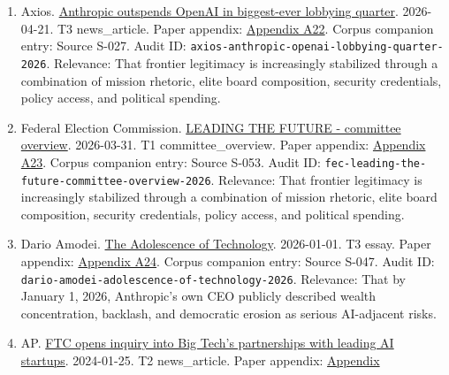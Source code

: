 \documentclass[
  american,
  11pt,
  letterpaper,
]{article}
\begin{document}
\begin{enumerate}
  press\_release. Paper appendix:
  \hyperref[appendix-a21-anthropic-and-palantir-partner-to-bring-claude-ai-models-to-aws-for-u-s-government-intelligence-and-defense-operations]{Appendix
  A21}. Corpus companion entry: Source S-098. Audit ID:
  \texttt{palantir-anthropic-aws-gov-partnership-2024}. Relevance: That
  by November 7, 2024 Anthropic model access for U.S. intelligence and
  defense agencies was being publicly distributed through a
  Palantir-plus-AWS stack.
\item
  Axios.
  \href{https://www.axios.com/2026/04/21/anthropic-outspends-openai-biggest-lobbying-quarter}{Anthropic
  outspends OpenAI in biggest-ever lobbying quarter}. 2026-04-21. T3
  news\_article. Paper appendix:
  \hyperref[appendix-a22-anthropic-outspends-openai-in-biggest-ever-lobbying-quarter]{Appendix
  A22}. Corpus companion entry: Source S-027. Audit ID:
  \texttt{axios-anthropic-openai-lobbying-quarter-2026}. Relevance: That
  frontier legitimacy is increasingly stabilized through a combination
  of mission rhetoric, elite board composition, security credentials,
  policy access, and political spending.
\item
  Federal Election Commission.
  \href{https://www.fec.gov/data/committee/C00916114/}{LEADING THE
  FUTURE - committee overview}. 2026-03-31. T1 committee\_overview.
  Paper appendix:
  \hyperref[appendix-a23-leading-the-future-committee-overview]{Appendix
  A23}. Corpus companion entry: Source S-053. Audit ID:
  \texttt{fec-leading-the-future-committee-overview-2026}. Relevance:
  That frontier legitimacy is increasingly stabilized through a
  combination of mission rhetoric, elite board composition, security
  credentials, policy access, and political spending.
\item
  Dario Amodei.
  \href{https://darioamodei.com/essay/the-adolescence-of-technology}{The
  Adolescence of Technology}. 2026-01-01. T3 essay. Paper appendix:
  \hyperref[appendix-a24-the-adolescence-of-technology]{Appendix A24}.
  Corpus companion entry: Source S-047. Audit ID:
  \texttt{dario-amodei-adolescence-of-technology-2026}. Relevance: That
  by January 1, 2026, Anthropic's own CEO publicly described wealth
  concentration, backlash, and democratic erosion as serious AI-adjacent
  risks.
\item
  AP.
  \href{https://apnews.com/article/67feef411ef311f0be543f546ef34b3d}{FTC
  opens inquiry into Big Tech's partnerships with leading AI startups}.
  2024-01-25. T2 news\_article. Paper appendix:
  \hyperref[appendix-a25-ftc-opens-inquiry-into-big-tech-s-partnerships-with-leading-ai-startups]{Appendix
}
\end{enumerate}
\end{document}
